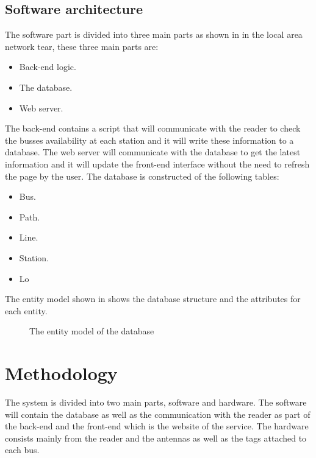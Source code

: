 \documentclass[a4paper,twoside]{IEEEtran}
\begin{document}
\subsection{Software architecture}
The software part is divided into three main parts as shown in  in the local area network tear, these three main parts are:
\begin{itemize}
\item
Back-end logic.
\item
The database.
\item
Web server.
\end{itemize}
The back-end contains a script that will communicate with the reader to check the busses availability at each station and it will write these information to a database. The web server will communicate with the database to get the latest information and it will update the front-end interface without the need to refresh the page by the user. The database is constructed of the following tables:
\begin{itemize}
\item
Bus.
\item
Path.
\item
Line.
\item
Station.
\item
Lo
\end{itemize}
The entity model shown in  shows the database structure and the attributes for each entity.
\begin{figure}
\centering
{}
\caption{The entity model of the database}
\label{entity}
\end{figure}
\section{Methodology}
The system is divided into two main parts, software and hardware. The software will contain the database as well as the communication with the reader as part of the back-end and the front-end which is the website of the service. The hardware consists mainly from the reader and the antennas as well as the tags attached to each bus.
\end{document}
